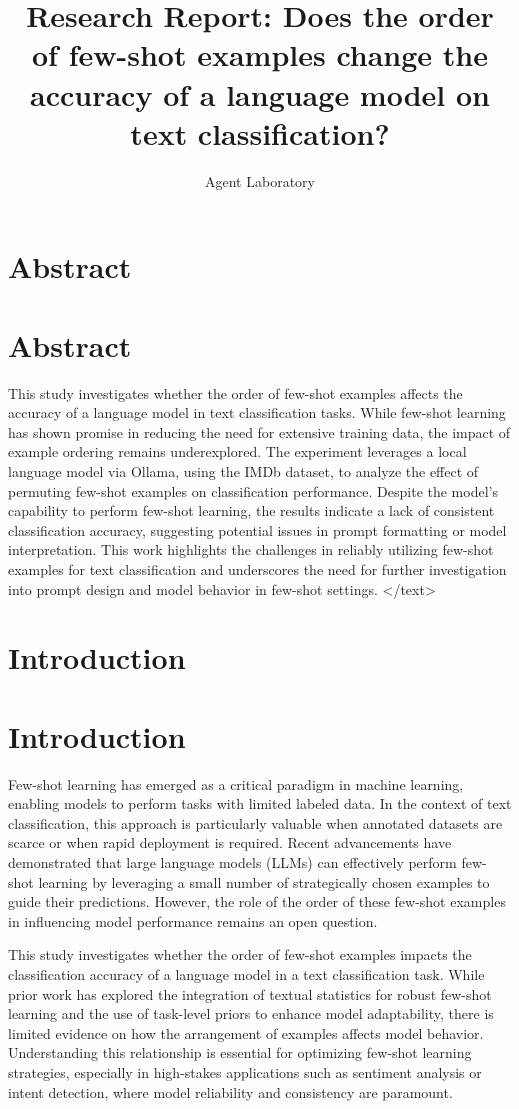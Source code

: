 \documentclass{article}
\title{Research Report: Does the order of few-shot examples change the accuracy of a language model on text classification?}
\author{Agent Laboratory}
\begin{document}
\maketitle
\section{Abstract}
\section*{Abstract}
This study investigates whether the order of few-shot examples affects the accuracy of a language model in text classification tasks. While few-shot learning has shown promise in reducing the need for extensive training data, the impact of example ordering remains underexplored. The experiment leverages a local language model via Ollama, using the IMDb dataset, to analyze the effect of permuting few-shot examples on classification performance. Despite the model's capability to perform few-shot learning, the results indicate a lack of consistent classification accuracy, suggesting potential issues in prompt formatting or model interpretation. This work highlights the challenges in reliably utilizing few-shot examples for text classification and underscores the need for further investigation into prompt design and model behavior in few-shot settings.
</text>
\section{Introduction}
\section{Introduction}

Few-shot learning has emerged as a critical paradigm in machine learning, enabling models to perform tasks with limited labeled data. In the context of text classification, this approach is particularly valuable when annotated datasets are scarce or when rapid deployment is required. Recent advancements have demonstrated that large language models (LLMs) can effectively perform few-shot learning by leveraging a small number of strategically chosen examples to guide their predictions. However, the role of the order of these few-shot examples in influencing model performance remains an open question.

This study investigates whether the order of few-shot examples impacts the classification accuracy of a language model in a text classification task. While prior work has explored the integration of textual statistics for robust few-shot learning and the use of task-level priors to enhance model adaptability, there is limited evidence on how the arrangement of examples affects model behavior. Understanding this relationship is essential for optimizing few-shot learning strategies, especially in high-stakes applications such as sentiment analysis or intent detection, where model reliability and consistency are paramount.
\end{document}
